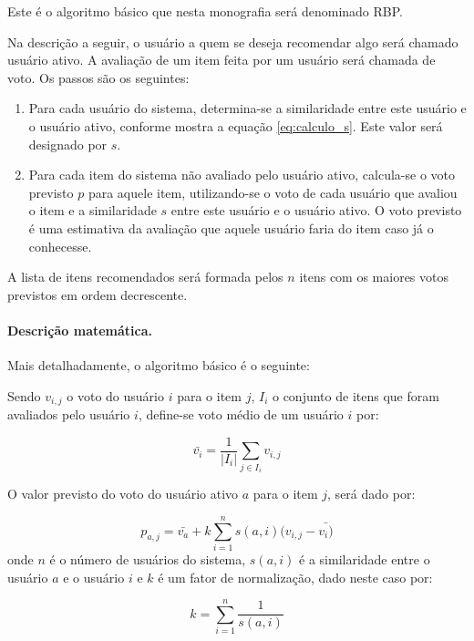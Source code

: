 Este é o algoritmo básico que nesta monografia será denominado RBP.

Na descrição a seguir, o usuário a quem se deseja recomendar algo será chamado usuário ativo. A avaliação de um item feita por um usuário será chamada de voto. Os passos são os seguintes:

\begin{enumerate}
\item 
Para cada usuário do sistema, determina-se a similaridade entre este usuário e o usuário ativo, conforme mostra a equação \ref{eq:calculo_s}. Este valor será designado por $s$.

\item Para cada item do sistema não avaliado pelo usuário ativo, calcula-se o voto previsto $p$ para aquele item, utilizando-se o voto de cada usuário que avaliou o item e a similaridade $s$ entre este usuário e o usuário ativo. O voto previsto é uma estimativa da avaliação que aquele usuário faria do item caso já o conhecesse.
\end{enumerate}

A lista de itens recomendados será formada pelos $n$ itens com os maiores votos previstos em ordem decrescente.

\paragraph{Descrição matemática.}

Mais detalhadamente, o algoritmo básico é o seguinte:

Sendo $v_{i,j}$ o voto do usuário $i$ para o item $j$, $I_{i}$ o conjunto de itens que foram avaliados pelo usuário $i$, define-se voto médio de um usuário $i$ por:

\begin{equation}
 \bar{v_{i}} = \frac{1}{|I_{i}|} \sum_{j \in I_{i}} v_{i,j}
\end{equation}

O valor previsto do voto do usuário ativo $a$ para o item $j$, será dado por:

\begin{equation}
 p_{a,j} = \bar{v_{a}} + k\sum_{i=1}^n{s(a,i) (v_{i,j} - \bar{v_{i})}}
 \label{eq:filtragem_colaborativa_similaridade} 
\end{equation}
onde $n$ é o número de usuários do sistema, $s(a,i)$ é a similaridade entre o usuário $a$ e o usuário $i$ e $k$ é um fator de normalização, dado neste caso por:

\begin{equation}
 k = \sum_{i=1}^n{\frac{1}{s(a,i)}}
\end{equation}


